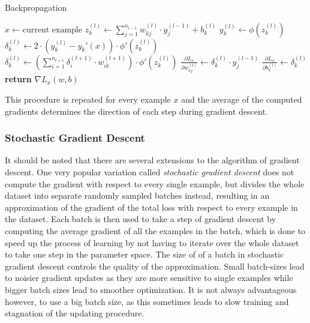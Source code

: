 \begin{algorithm}
  \caption{Backpropagation}
  \label{algo:backpropagation}
  \begin{algorithmic}[1]
    \State \(x\gets \text{current example}\)
        \State \(z_k^{(l)}\gets \sum_{j=1}^{n_{l-1}}{w_{kj}^{(l)} \cdot
          y_j^{(l-1)}} + b_k^{(l)}\)
        \State \(y_k^{(l)}\gets \phi(z_k^{(l)})\)
      \EndFor
    \EndFor
          \State \(\delta_k^{(l)}\gets 2 \cdot (y_k^{(l)}-y_k'(x)) \cdot
          \phi'(z_k^{(l)})\)
        \Else
          \State \(\delta_k^{(l)}\gets  \left(\sum_{i=1}^{n_{l+1}}{\delta_i^{(l+1)} \cdot w_{ik}^{(l+1)}}\right)
            \cdot \phi'(z_k^{(l)})\)
        \EndIf
          \State \(\frac{\partial L_x}{\partial w_{kj}^{(l)}}\gets
          \delta_k^{(l)} \cdot y_j^{(l-1)}\)
        \EndFor
        \State \(\frac{\partial L_x}{\partial b_{k}^{(l)}}\gets
          \delta_k^{(l)}\)  
      \EndFor
    \EndFor
    \State\textbf{return }\(\nabla L_x(w, b)\)
  \end{algorithmic}
\end{algorithm}
This procedure is repeated for every example \(x\) and the average of
the computed gradients determines the direction of each step during
gradient descent.

\subsubsection{Stochastic Gradient Descent}
\label{sec:stochastic}

It should be noted that there are several extensions to the algorithm
of gradient descent. One very popular variation called
\textit{stochastic gradient descent} \cite{Bottou} does not compute the
gradient with respect to every single example, but divides the whole
dataset into separate randomly sampled batches instead, resulting in
an approximation of the gradient of the total loss with respect to
every example in the dataset. Each batch is
then used to take a step of gradient descent by
computing the average gradient of all the examples in the batch, which
is done to speed up the process of learning by not
having to iterate over the whole dataset to take one step in the
parameter space. The size of of a batch in stochastic
gradient descent controls the quality of the approximation. Small
batch-sizes lead to noisier gradient updates as they are more
sensitive to single examples while bigger batch sizes lead to smoother
optimization. It is not always advantageous however, to use a big
batch size, as this sometimes leads to slow training and stagnation of
the updating procedure.

